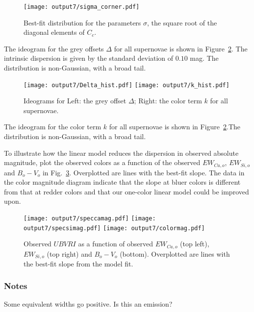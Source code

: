 \documentclass[11pt, oneside]{article}   	%
\begin{document}
 \begin{figure}[htbp] %
   \centering
   \texttt{[image: output7/sigma\_corner.pdf]} 
   \caption{Best-fit distribution for the parameters $\sigma$, the square root of the diagonal elements of $C_c$.}
   \label{sigma:fig}
\end{figure}

The ideogram for the grey offsets $\Delta$ for all supernovae is shown in Figure~\ref{hist:fig}.  The intrinsic dispersion
is given by the standard deviation of $0.10$ mag.  The distribution is non-Gaussian, with a broad tail. 
\begin{figure}[htbp] %
   \centering
   \texttt{[image: output7/Delta\_hist.pdf]} 
   \texttt{[image: output7/k\_hist.pdf]} 
   \caption{Ideograms for Left: the grey offset $\Delta$; Right: the color term $k$ for all supernovae.}
   \label{hist:fig}
\end{figure}

The ideogram for the color term  $k$ for all supernovae is shown in Figure~\ref{hist:fig}.The distribution is non-Gaussian, with a broad tail. 

To illustrate how the linear model reduces the dispersion in observed absolute magnitude, plot the observed colors as a
function of the observed  $EW_{Ca, o}$, $EW_{Si,o}$ and $B_o-V_o$ in Fig.~\ref{magresidual:fig}.  Overplotted are lines with the
best-fit slope.  The data in the color magnitude diagram indicate that the slope at bluer colors is different from that at redder colors
and that our one-color linear model could be improved upon.

\begin{figure}[htbp] %
   \centering
   \texttt{[image: output7/speccamag.pdf]} 
      \texttt{[image: output7/specsimag.pdf]} 
   \texttt{[image: output7/colormag.pdf]} 
   \caption{Observed $UBVRI$ as a function of observed   $EW_{Ca, o}$ (top left), $EW_{Si,o}$ (top right) and $B_o-V_o$ (bottom).
   Overplotted are lines with the best-fit slope from the model fit.}
   \label{magresidual:fig}
\end{figure}

\subsubsection{Notes}
Some equivalent widths go positive.  Is this an emission?
\end{document}
